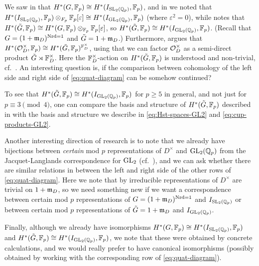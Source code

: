 We saw in  that $H^{*}(G,\mathbb{F}_{p}) \cong H^{*}(I_{\operatorname{SL}_{2}(\mathbb{Q}_{p})},\mathbb{F}_{p})$, and in  we noted that $H^{*}(I_{\operatorname{SL}_{2}(\mathbb{Q}_{p})},\mathbb{F}_{p}) \otimes_{F_{p}} \mathbb{F}_{p}[\varepsilon] \cong H^{*}(I_{\operatorname{GL}_{2}(\mathbb{Q}_{p})},\mathbb{F}_{p})$ (where $\varepsilon^{2} = 0$), while \cite[Sect.~6.3]{Sor} notes that $H^{*}(\tilde{G},\mathbb{F}_{p}) \cong H^{*}(G,\mathbb{F}_{p}) \otimes_{\mathbb{F}_{p}} \mathbb{F}_{p}[\varepsilon]$, so $H^{*}(\tilde{G},\mathbb{F}_{p}) \cong H^{*}(I_{\operatorname{GL}_{2}(\mathbb{Q}_{p})},\mathbb{F}_{p})$. (Recall that $G = (1+\mathfrak{m}_{D})^{\operatorname{Nrd} = 1}$ and $\tilde{G} = 1+\mathfrak{m}_{D}$.) Furthermore, \cite[Sect.~6.3]{Sor} argues that $H^{*}(\mathcal{O}_{D}^{\times},\mathbb{F}_{p}) \cong H^{*}(\tilde{G},\mathbb{F}_{p})^{\mathbb{F}_{D}^{\times}}$, using that we can factor $\mathcal{O}_{D}^{\times}$ as a semi-direct product $\tilde{G} \rtimes \mathbb{F}_{D}^{\times}$. Here the $\mathbb{F}_{D}^{\times}$-action on $H^{*}(\tilde{G},\mathbb{F}_{p})$ is understood and non-trivial, cf.\ \cite[Prop.~7~(b)]{Henn}. An interesting question is, if the comparison between cohomology of the left side and right side of \eqref{eq:quat-diagram} can be somehow continued?

\begin{remark}
  To see that $H^{*}(\tilde{G},\mathbb{F}_{p}) \cong H^{*}(I_{\operatorname{GL}_{2}(\mathbb{Q}_{p})},\mathbb{F}_{p})$ for $p\geq5$ in general, and not just for $p \equiv 3 \pmod{4}$, one can compare the basis and structure of $H^{*}(\tilde{G},\mathbb{F}_{p})$ described in \cite[Thm.~3.2]{Ravenel} with the basis and structure we describe in \eqref{eq:Hst-spaces-GL2} and \eqref{eq:cup-products-GL2}.
\end{remark}

Another interesting direction of research is to note that we already have bijections between \emph{certain} mod $p$ representations of $D^{\times}$ and $\operatorname{GL}_{2}(\mathbb{Q}_{p})$ from the Jacquet-Langlands correspondence for $\operatorname{GL}_{2}$ (cf.\ \cite{JL}), and we can ask whether there are similar relations in between the left and right side of the other rows of \eqref{eq:quat-diagram}. Here we note that by \cite[Rem.~4.5]{JL-remark} irreducible representations of $D^{\times}$ are trivial on $1+\mathfrak{m}_{D}$, so we need something new if we want a correspondence between certain mod $p$ representations of $G = (1+\mathfrak{m}_{D})^{\operatorname{Nrd} = 1}$ and $I_{\operatorname{SL}_{2}(\mathbb{Q}_{p})}$ or between certain mod $p$ representations of $\tilde{G} = 1+\mathfrak{m}_{D}$ and $I_{\operatorname{GL}_{2}(\mathbb{Q}_{p})}$.

Finally, although we already have isomorphisms $H^{*}(G,\mathbb{F}_{p}) \cong H^{*}(I_{\operatorname{SL}_{2}(\mathbb{Q}_{p})},\mathbb{F}_{p})$ and $H^{*}(\tilde{G},\mathbb{F}_{p}) \cong H^{*}(I_{\operatorname{GL}_{2}(\mathbb{Q}_{p})},\mathbb{F}_{p})$, we note that these were obtained by concrete calculations, and we would really prefer to have canonical isomorphisms (possibly obtained by working with the corresponding row of \eqref{eq:quat-diagram}).

